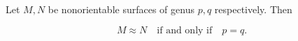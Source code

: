 Let $M, N$ be nonorientable surfaces of genus $p, q$ respectively. Then

$$M \approx N \quad \text{if and only if} \quad p = q.$$
